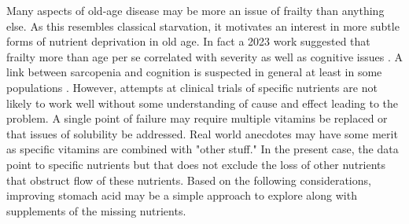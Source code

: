 \documentclass[aps,secnumarabic,balancelastpage,amsmath,amssymb,nofootinbib]{revtex4}
\begin{document}
Many aspects of old-age disease may be 
more an issue of frailty than anything else.
As this resembles classical starvation, it motivates
an interest in more subtle forms of nutrient deprivation
in old age.
In fact a 2023 work suggested that frailty more
than age per se correlated with \mjmdisease severity
as well as cognitive issues
\cite{Matsumoto_Shibata_Kishi_Long_COVID_hypertension_2023}.
A link between sarcopenia and cognition is suspected
in general at least in some populations
\cite{PMC9965467}.
However, attempts at clinical trials of specific nutrients
are not likely to work well without some understanding
of cause and effect leading to the problem. A single
point of failure may require multiple vitamins be
replaced or that issues of solubility be addressed.
Real world anecdotes may have some merit as specific
vitamins are combined with "other stuff."
In the present case, the data point to specific nutrients
but that does not exclude the loss of other nutrients
that obstruct flow of these nutrients. 
Based on the following considerations, improving
stomach acid may be a simple approach to explore
along with supplements of the missing nutrients.
\end{document}
